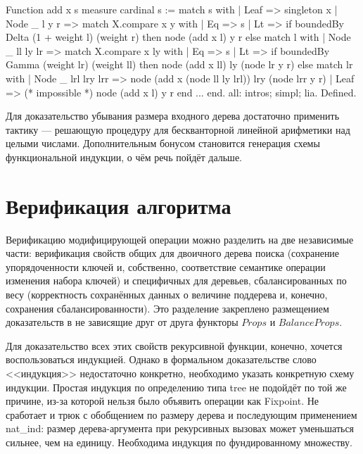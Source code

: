 \documentclass[a4paper,14pt]{extarticle}
\begin{document}
\begin{coqcode}

Function add x s {measure cardinal s} := match s with
| Leaf => singleton x
| Node _ l y r =>
  match X.compare x y with
  | Eq => s
  | Lt =>
    if boundedBy Delta (1 + weight l) (weight r)
    then node (add x l) y r
    else match l with
    | Node _ ll ly lr =>
      match X.compare x ly with
      | Eq => s
      | Lt =>
        if boundedBy Gamma (weight lr) (weight ll)
        then node (add x ll) ly (node lr y r)
        else match lr with
        | Node _ lrl lry lrr =>
          node (add x (node ll ly lrl)) lry (node lrr y r)
        | Leaf => (* impossible *) node (add x l) y r
        end
      ...
end.
all: intros; simpl; lia. Defined.

\end{coqcode}

Для доказательство убывания размера входного дерева
достаточно применить тактику  ---
решающую процедуру для бескванторной линейной арифметики
над целыми числами\cite{micromega}.
Дополнительным бонусом становится генерация схемы функциональной
индукции, о чём речь пойдёт дальше.

\clearpage
\section{Верификация алгоритма}

Верификацию модифицирующей операции можно разделить
на две независимые части:
верификация свойств общих для двоичного дерева поиска
(сохранение упорядоченности ключей и, собственно,
соответствие семантике операции изменения набора ключей)
и специфичных для деревьев, сбалансированных по весу
(корректность сохранённых данных о величине поддерева
и, конечно, сохранения сбалансированности).
Это разделение закреплено размещением
доказательств в не зависящие друг от друга функторы
\( Props \) и \( BalanceProps \).

Для доказательство всех этих свойств рекурсивной функции,
конечно, хочется воспользоваться индукцией.
Однако в формальном доказательстве слово <<индукция>>
недостаточно конкретно, необходимо указать конкретную схему индукции.
Простая индукция по определению типа tree не подойдёт
по той же причине, из-за которой нельзя было объявить
операции как Fixpoint.
Не сработает и трюк с обобщением по размеру дерева и
последующим применением nat\_ind:
размер дерева-аргумента при рекурсивных вызовах
может уменьшаться сильнее, чем на единицу.
Необходима индукция по фундированному множеству.
\end{document}
